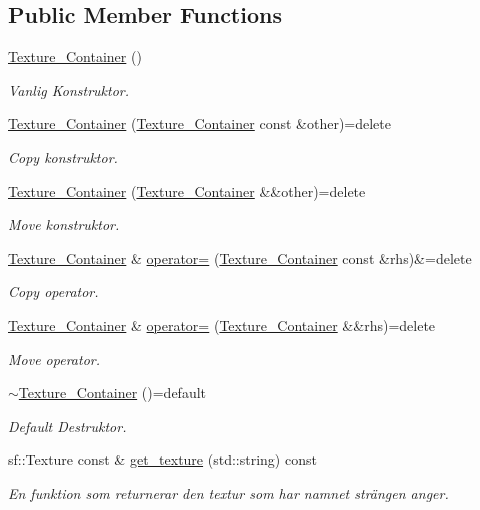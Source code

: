 \subsection*{Public Member Functions}
\begin{DoxyCompactItemize}
\item 
\hyperlink{classTexture__Container_a40fff5e61bf994ba704a43e87b3e3a18}{Texture\+\_\+\+Container} ()
\begin{DoxyCompactList}\small\item\em Vanlig Konstruktor. \end{DoxyCompactList}\item 
\hyperlink{classTexture__Container_aa5bb29d2e6f49cf6e9784d18888d95e5}{Texture\+\_\+\+Container} (\hyperlink{classTexture__Container}{Texture\+\_\+\+Container} const \&other)=delete
\begin{DoxyCompactList}\small\item\em Copy konstruktor. \end{DoxyCompactList}\item 
\hyperlink{classTexture__Container_a372127d3c359f96c7c4aa3b2106e3fd7}{Texture\+\_\+\+Container} (\hyperlink{classTexture__Container}{Texture\+\_\+\+Container} \&\&other)=delete
\begin{DoxyCompactList}\small\item\em Move konstruktor. \end{DoxyCompactList}\item 
\hyperlink{classTexture__Container}{Texture\+\_\+\+Container} \& \hyperlink{classTexture__Container_aaf58055affd862bac102efebfeb41bbc}{operator=} (\hyperlink{classTexture__Container}{Texture\+\_\+\+Container} const \&rhs)\&=delete
\begin{DoxyCompactList}\small\item\em Copy operator. \end{DoxyCompactList}\item 
\hyperlink{classTexture__Container}{Texture\+\_\+\+Container} \& \hyperlink{classTexture__Container_a9364b90bbf24d4b582c868e37de2e1ec}{operator=} (\hyperlink{classTexture__Container}{Texture\+\_\+\+Container} \&\&rhs)=delete
\begin{DoxyCompactList}\small\item\em Move operator. \end{DoxyCompactList}\item 
\hyperlink{classTexture__Container_a8b07cb110e4d35f2c4b42c67ab4ddda0}{$\sim$\+Texture\+\_\+\+Container} ()=default
\begin{DoxyCompactList}\small\item\em Default Destruktor. \end{DoxyCompactList}\item 
sf\+::\+Texture const \& \hyperlink{classTexture__Container_afce993abd37ca2a9647a154a561a6e74}{get\+\_\+texture} (std\+::string) const 
\begin{DoxyCompactList}\small\item\em En funktion som returnerar den textur som har namnet strängen anger. \end{DoxyCompactList}\end{DoxyCompactItemize}
